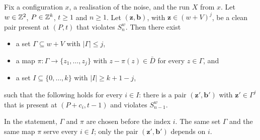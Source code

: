 \begin{lemma}[transport]\label{fgt:transport}
Fix a configuration $x$, a realisation of the noise, and the run $X$ from $x$. Let $w\in\mathbb{Z}^2$, $P\in\mathbb{Z}^k$, $t\ge1$ and $n\ge1$. Let $(\mathbf z,\mathbf b)$, with $\mathbf z\in(w+V)^j$, be a clean pair present at $(P,t)$ that violates $S^w_n$. Then there exist
\begin{itemize}
\item a set $\Gamma\subseteq w+V$ with $|\Gamma|\le j$,
\item a map $\pi:\Gamma\to\{z_1,\dots,z_j\}$ with $z-\pi(z)\in\bar D$ for every $z\in\Gamma$, and
\item a set $I\subseteq\{0,\dots,k\}$ with $|I|\ge k+1-j$,
\end{itemize}
such that the following holds for every $i\in I$: there is a pair $(\mathbf z',\mathbf b')$ with $\mathbf z'\in\Gamma^j$ that is present at $(P+c_i,t-1)$ and violates $S^w_{n-1}$.
\end{lemma}

In the statement, $\Gamma$ and $\pi$ are chosen before the index $i$. The same set $\Gamma$ and the same map $\pi$ serve every $i\in I$; only the pair $(\mathbf z',\mathbf b')$ depends on $i$.


